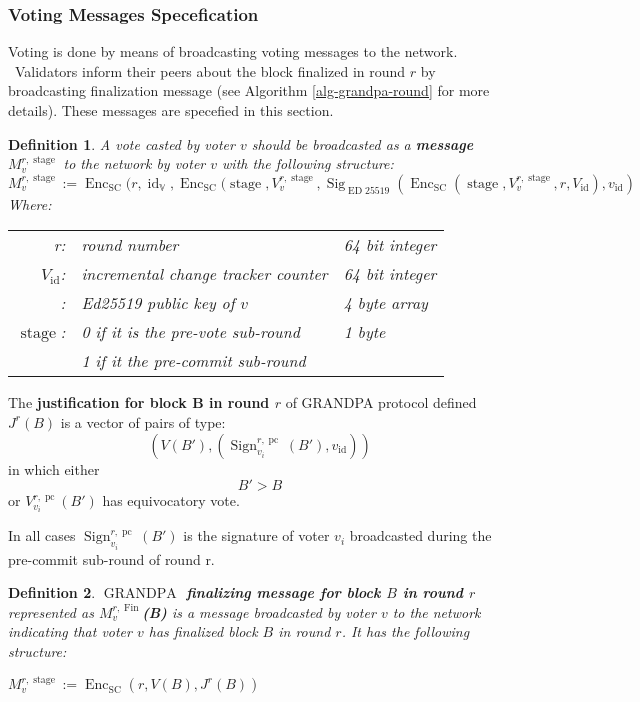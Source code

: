 \documentclass{article}
\newcommand{\assign}{:=}
\newcommand{\tmop}[1]{\ensuremath{\operatorname{#1}}}
\newcommand{\tmstrong}[1]{\textbf{#1}}
\newcommand{\tmtextbf}[1]{{\bfseries{#1}}}
\newtheorem{definition}{Definition}
\providecommand{\tmop}[1]{\ensuremath{\mathrm{#1}}}
\providecommand{\tmstrong}[1]{\tmtextbf{#1}}
\providecommand{\tmtextbf}[1]{\tmtextbf{#1}}
\newtheorem{definition}{Definition}
\begin{document}
\subsubsection{Voting Messages Specefication}

Voting is done by means of broadcasting voting messages to the network. \
Validators inform their peers about the block finalized in round $r$ by
broadcasting finalization message (see Algorithm \ref{alg-grandpa-round} for
more details). These messages are specefied in this section.

\begin{definition}
  A vote casted by voter $v$ should be broadcasted as a {\tmstrong{message
  $M^{r, \tmop{stage}}_v$}} to the network by voter $v$ with the following
  structure:
  \[ M^{r, \tmop{stage}}_v \assign \tmop{Enc}_{\tmop{SC}} (r,
     \tmop{id}_{\mathbb{V}}, \tmop{Enc}_{\tmop{SC}} (\tmop{stage}, V_v^{r,
     \tmop{stage}}, \tmop{Sig}_{\tmop{ED} 25519} (\tmop{Enc}_{\tmop{SC}}
     (\tmop{stage}, V_v^{r, \tmop{stage}}, r, V_{\tmop{id}}), v_{\tmop{id}})
  \]
  Where:
  \begin{center}
    \begin{tabular}{rll}
      r: & round number & 64 bit integer\\
      $V_{\tmop{id}}$: & incremental change tracker counter & 64 bit integer\\
      {\rightaligned{$v_{\tmop{id}}$}}: & Ed25519 public key of $v$ & 4 byte
      array\\
      {\rightaligned{}}$\tmop{stage}$: & 0 if it is the pre-vote sub-round & 1
      byte\\
      & 1 if it the pre-commit sub-round & 
    \end{tabular}
  \end{center}
  
\end{definition}

The {\tmstrong{justification for block B in round $r$}} of GRANDPA protocol
defined $J^r (B)$ is a vector of pairs of type:
\[ (V (B'), (\tmop{Sign}^{r, \tmop{pc}}_{v_i} (B'), v_{\tmop{id}})) \]
in which either
\[ B' > B \]
or $V^{r, \tmop{pc}}_{v_i} (B')$ has equivocatory vote.

In all cases $\tmop{Sign}^{r, \tmop{pc}}_{v_i} (B')$ is the signature of voter
$v_i$ broadcasted during the pre-commit sub-round of round r.

\begin{definition}
  {\tmstrong{$\tmop{GRANDPA}$ finalizing message for block $B$ in round $r$}}
  represented as {\tmstrong{$M_v^{r, \tmop{Fin}}$(B)}} is a message
  broadcasted by voter $v$ to the network indicating that voter $v$ has
  finalized block $B$ in round $r$. It has the following structure:
  
  $M^{r, \tmop{stage}}_v \assign \tmop{Enc}_{\tmop{SC}} (r, V (B), J^r (B))$
\end{definition}
\end{document}
